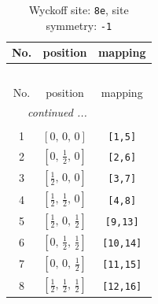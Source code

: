 \documentclass[fleqn,8pt]{jsarticle}
\begin{document}
\renewcommand{\arraystretch}{1.2}
\begin{longtable}{ccc}
\caption{Wyckoff site: {\tt 8e}, site symmetry: {\tt -1}}
 \\
 \hline \hline
No. & position & mapping \\ \hline \endfirsthead

\multicolumn{2}{l}{\tablename\ \thetable{}} \\
 \hline \hline
No. & position & mapping \\ \hline \endhead

 \hline \hline
\multicolumn{2}{r}{\footnotesize\it continued ...} \\ \endfoot

 \hline \hline
\multicolumn{2}{r}{} \\ \endlastfoot

1 & $\left[ 0,\, 0,\, 0 \right]$ & {\tt [1,5]} \\ \hline
2 & $\left[ 0,\, \frac{1}{2},\, 0 \right]$ & {\tt [2,6]} \\ \hline
3 & $\left[ \frac{1}{2},\, 0,\, 0 \right]$ & {\tt [3,7]} \\ \hline
4 & $\left[ \frac{1}{2},\, \frac{1}{2},\, 0 \right]$ & {\tt [4,8]} \\ \hline
5 & $\left[ \frac{1}{2},\, 0,\, \frac{1}{2} \right]$ & {\tt [9,13]} \\ \hline
6 & $\left[ 0,\, \frac{1}{2},\, \frac{1}{2} \right]$ & {\tt [10,14]} \\ \hline
7 & $\left[ 0,\, 0,\, \frac{1}{2} \right]$ & {\tt [11,15]} \\ \hline
8 & $\left[ \frac{1}{2},\, \frac{1}{2},\, \frac{1}{2} \right]$ & {\tt [12,16]} \\
\end{longtable}
\renewcommand{\arraystretch}{1.2}
\end{document}
